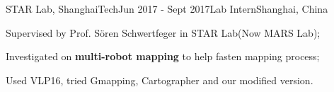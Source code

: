 \ifx\lang\eng
	\begin{rSubsection}{STAR Lab, ShanghaiTech}{Jun 2017 - Sept 2017}{Lab Intern}{Shanghai, China}
		\item Supervised by Prof. Sören Schwertfeger in STAR Lab(Now MARS Lab);
		\item Investigated on \textbf{multi-robot mapping} to help fasten mapping process;
		\item Used VLP16, tried Gmapping, Cartographer and our modified version.
	\end{rSubsection}
\fi